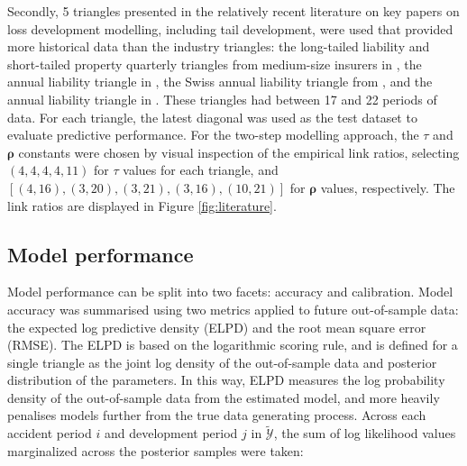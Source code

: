 Secondly, 5
triangles presented in the
relatively recent literature on key
papers on loss development
modelling,
including tail development, were used that provided more
historical data than the industry triangles:
the long-tailed liability and short-tailed property 
quarterly triangles from medium-size insurers
in \cite{balona2022}, the annual liability triangle in \cite{merz2015},
the Swiss annual liability triangle from \cite{gisler2009},
and the annual liability triangle in \cite{verrall2012}.
These triangles had between 17 and 22 periods of
data. For each triangle, the latest diagonal was used as the
test dataset to evaluate predictive performance.
For the two-step modelling approach, the
$\tau$ and $\bm{\rho}$ constants were chosen
by visual inspection of the empirical link ratios,
selecting $(4, 4, 4, 4, 11)$ for $\tau$ values
for each triangle,
and $[(4, 16), (3, 20), (3, 21), (3, 16), (10, 21)]$
for $\bm{\rho}$ values, respectively.
The link ratios are displayed in Figure \ref{fig:literature}.

\subsection{Model performance}
Model performance can be split into two facets:
accuracy and calibration.
Model accuracy was summarised using two metrics
applied to future out-of-sample data: the expected
log predictive density (ELPD) and the root mean
square error (RMSE). 
The ELPD \citep{vehtari2017} is based on the logarithmic scoring
rule, and is defined for a single triangle
as the joint log density of the out-of-sample
data and posterior distribution of the parameters. 
In this way, ELPD measures the log probability density
of the out-of-sample data from the estimated model,
and more heavily
penalises models further from
the true data generating process.
Across each accident period $i$ and development
period $j$ in $\mathcal{\tilde{Y}}$, the
sum of log likelihood values marginalized across the posterior
samples were taken:


